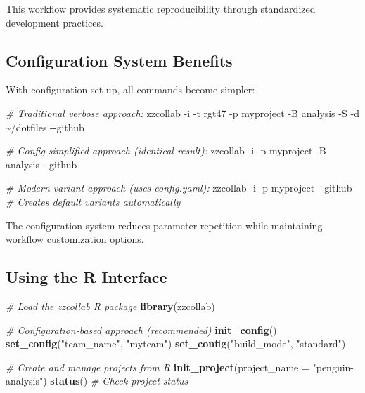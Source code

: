 \documentclass[
]{article}
\newenvironment{Shaded}{\begin{snugshade}}{\end{snugshade}}
\newcommand{\AttributeTok}[1]{\textcolor[rgb]{0.13,0.29,0.53}{#1}}
\newcommand{\CommentTok}[1]{\textcolor[rgb]{0.56,0.35,0.01}{\textit{#1}}}
\newcommand{\ExtensionTok}[1]{#1}
\newcommand{\FunctionTok}[1]{\textcolor[rgb]{0.13,0.29,0.53}{\textbf{#1}}}
\newcommand{\NormalTok}[1]{#1}
\newcommand{\StringTok}[1]{\textcolor[rgb]{0.31,0.60,0.02}{#1}}
\begin{document}
This workflow provides systematic reproducibility through standardized
development practices.

\subsection{Configuration System
Benefits}\label{configuration-system-benefits}

With configuration set up, all commands become simpler:

\begin{Shaded}
\begin{Highlighting}[]
\CommentTok{\# Traditional verbose approach:}
\ExtensionTok{zzcollab} \AttributeTok{{-}i} \AttributeTok{{-}t}\NormalTok{ rgt47 }\AttributeTok{{-}p}\NormalTok{ myproject }\AttributeTok{{-}B}\NormalTok{ analysis }\AttributeTok{{-}S} \AttributeTok{{-}d}\NormalTok{ \textasciitilde{}/dotfiles }\AttributeTok{{-}{-}github}

\CommentTok{\# Config{-}simplified approach (identical result):}
\ExtensionTok{zzcollab} \AttributeTok{{-}i} \AttributeTok{{-}p}\NormalTok{ myproject }\AttributeTok{{-}B}\NormalTok{ analysis }\AttributeTok{{-}{-}github}

\CommentTok{\# Modern variant approach (uses config.yaml):}
\ExtensionTok{zzcollab} \AttributeTok{{-}i} \AttributeTok{{-}p}\NormalTok{ myproject }\AttributeTok{{-}{-}github}    \CommentTok{\# Creates default variants automatically}
\end{Highlighting}
\end{Shaded}

The configuration system reduces parameter repetition while maintaining
workflow customization options.

\subsection{Using the R Interface}\label{using-the-r-interface}

\begin{Shaded}
\begin{Highlighting}[]
\CommentTok{\# Load the zzcollab R package}
\FunctionTok{library}\NormalTok{(zzcollab)}

\CommentTok{\# Configuration{-}based approach (recommended)}
\FunctionTok{init\_config}\NormalTok{()}
\FunctionTok{set\_config}\NormalTok{(}\StringTok{"team\_name"}\NormalTok{, }\StringTok{"myteam"}\NormalTok{)}
\FunctionTok{set\_config}\NormalTok{(}\StringTok{"build\_mode"}\NormalTok{, }\StringTok{"standard"}\NormalTok{)}

\CommentTok{\# Create and manage projects from R}
\FunctionTok{init\_project}\NormalTok{(}\AttributeTok{project\_name =} \StringTok{"penguin{-}analysis"}\NormalTok{)}
\FunctionTok{status}\NormalTok{()  }\CommentTok{\# Check project status}
\end{Highlighting}
\end{Shaded}
\end{document}
